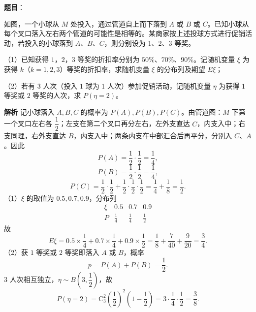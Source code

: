 \begin{answer}

\textbf{题目}：

如图，一个小球从 $M$ 处投入，通过管道自上而下落到 $A$ 或 $B$ 或 $C$。已知小球从每个叉口落入左右两个管道的可能性是相等的。某商家按上述投球方式进行促销活动，若投入的小球落到 $A$、$B$、$C$，则分别设为 $1$、$2$、$3$ 等奖。

（1）已知获得 $1$，$2$，$3$ 等奖的折扣率分别为 $50\%$、$70\%$、$90\%$。记随机变量 $\xi$ 为获得 $k$（$k=1,2,3$）等奖的折扣率，求随机变量 $\xi$ 的分布列及期望 $E\xi$；

（2）若有 $3$ 人次（投入 $1$ 球为 $1$ 人次）参加促销活动，记随机变量 $\eta$ 为获得 $1$ 等奖或 $2$ 等奖的人次，求 $P(\eta=2)$。
\nopagebreak[4]
\begin{center}\end{center}
\nopagebreak[4]
\textbf{解析}
记小球落入 $A,B,C$ 的概率为 $P(A),P(B),P(C)$。由管道图：$M$ 下第一个叉口左右各 $\dfrac12$；左支在第二个叉口再分左右，左外支直达 $C$，内支入中；右支同理，右外支直达 $B$，内支入中；两条内支在中部汇合后再平分，分别入 $C$、$A$。因此
\nopagebreak[4]
\[P(A)=\frac12\cdot\frac12=\frac14,\]
\nopagebreak[4]
\[P(B)=\frac12\cdot\frac12=\frac14,\]
\nopagebreak[4]
\[P(C)=\frac12\cdot\frac12+\frac12\cdot\frac12\cdot\frac12=\frac14+\frac18=\frac12.\]
（1）$\xi$ 的取值为 $0.5,0.7,0.9$，分布列
\nopagebreak[4]
\[\begin{array}{c|ccc}
\xi & 0.5 & 0.7 & 0.9\\ \hline
P & \frac14 & \frac14 & \frac12
\end{array}\]
故
\nopagebreak[4]
\[E\xi=0.5\times\frac14+0.7\times\frac14+0.9\times\frac12
=\frac18+\frac7{40}+\frac9{20}=\frac34.\]
（2）获 $1$ 等奖或 $2$ 等奖即落入 $A$ 或 $B$，概率
\nopagebreak[4]
\[p=P(A)+P(B)=\frac12.\]
$3$ 人次相互独立，$\eta\sim B\left(3,\dfrac12\right)$，故
\nopagebreak[4]
\[P(\eta=2)=\mathrm C_3^2\left(\frac12\right)^2\left(1-\frac12\right)
=3\cdot\frac14\cdot\frac12=\frac38.\]


\end{answer}
